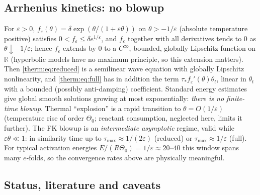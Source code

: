 \subsection{Arrhenius kinetics: no blowup}
\label{therm:sec:arrhenius}

For $\varepsilon>0$, $f_\varepsilon(\theta)=\delta\exp(\theta/(1+\varepsilon\theta))$ on $\theta>-1/\varepsilon$ (absolute temperature
positive) satisfies $0<f_\varepsilon\le\delta e^{1/\varepsilon}$, and $f_\varepsilon$ together with all derivatives
tends to $0$ as $\theta\downarrow-1/\varepsilon$; hence $f_\varepsilon$ extends by $0$ to a $C^\infty$, bounded,
globally Lipschitz function on $\mathbb{R}$ (hyperbolic models have no maximum principle,
so this extension matters).  Then \cref{therm:eq:reduced} is a semilinear wave
equation with globally Lipschitz nonlinearity, and \cref{therm:eq:full} has in
addition the term $\tau_* f_\varepsilon'(\theta)\theta_t$, linear in $\theta_t$ with a bounded (possibly
anti-damping) coefficient.  Standard energy estimates give global smooth
solutions growing at most exponentially: \emph{there is no finite-time blowup}.
Thermal ``explosion'' is a rapid transition to $\theta=O(1/\varepsilon)$ (temperature rise
of order $\Theta_0$; reactant consumption, neglected here, limits it further).  The FK
blowup is an \emph{intermediate asymptotic} regime, valid while $\varepsilon\theta\ll1$: in
similarity time up to $\tau_{\max}\approx1/(2\varepsilon)$ (reduced) or $\tau_{\max}\approx1/\varepsilon$ (full).  For
typical activation energies $E/(R\Theta_0)=1/\varepsilon\approx20$--$40$ this window spans many
$e$-folds, so the convergence rates above are physically meaningful.

\subsection{Status, literature and caveats}
\label{therm:sec:status}

